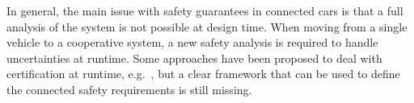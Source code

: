 



In general, the main issue with safety guarantees in connected cars is that a full analysis of the system is not possible at design time. When moving from a single vehicle to a cooperative system, a new safety analysis is required to handle uncertainties at runtime. Some approaches have been proposed to deal with certification at runtime, e.g.~\cite{runtime1, runtime3}, but a clear framework that can be used to define the connected safety requirements is still missing.


